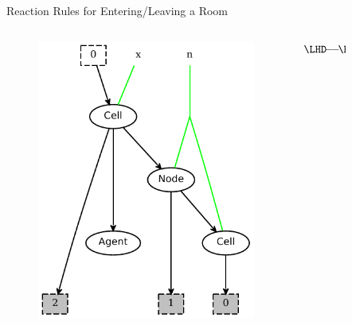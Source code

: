 \documentclass{beamer}
\providecommand\longdoublearrowRHD{\mathrel\LHD\joinrel\relbar\joinrel\relbar\joinrel\mathrel\RHD}
\begin{document}
\begin{frame}{Reaction Rules for Entering/Leaving a Room}
  \begin{columns}
    \begin{column}{0.45\textwidth}
      \begin{figure}
        \centering
        \includegraphics[width=\textwidth]{../models/agent2/goIn_lhs.pdf}
      \end{figure}
    \end{column}
    \begin{column}{0.1\textwidth}
      $\longdoublearrowRHD$
    \end{column}
    \begin{column}{0.45\textwidth}
      \begin{figure}
        \centering

\end{figure}
\end{column}
\end{columns}
\end{frame}
\end{document}
